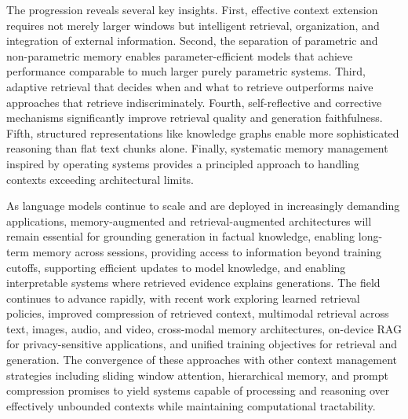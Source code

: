 The progression reveals several key insights. First, effective context extension requires not merely larger windows but intelligent retrieval, organization, and integration of external information. Second, the separation of parametric and non-parametric memory enables parameter-efficient models that achieve performance comparable to much larger purely parametric systems. Third, adaptive retrieval that decides when and what to retrieve outperforms naive approaches that retrieve indiscriminately. Fourth, self-reflective and corrective mechanisms significantly improve retrieval quality and generation faithfulness. Fifth, structured representations like knowledge graphs enable more sophisticated reasoning than flat text chunks alone. Finally, systematic memory management inspired by operating systems provides a principled approach to handling contexts exceeding architectural limits.

As language models continue to scale and are deployed in increasingly demanding applications, memory-augmented and retrieval-augmented architectures will remain essential for grounding generation in factual knowledge, enabling long-term memory across sessions, providing access to information beyond training cutoffs, supporting efficient updates to model knowledge, and enabling interpretable systems where retrieved evidence explains generations. The field continues to advance rapidly, with recent work exploring learned retrieval policies, improved compression of retrieved context, multimodal retrieval across text, images, audio, and video, cross-modal memory architectures, on-device RAG for privacy-sensitive applications, and unified training objectives for retrieval and generation. The convergence of these approaches with other context management strategies including sliding window attention, hierarchical memory, and prompt compression promises to yield systems capable of processing and reasoning over effectively unbounded contexts while maintaining computational tractability.
